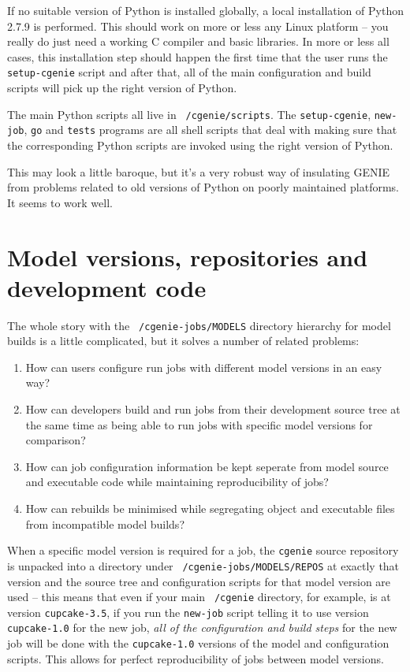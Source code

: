 \documentclass[a4paper,10pt,article]{memoir}
\begin{document}
If no suitable version of Python is installed globally, a local
installation of Python 2.7.9 is performed.  This should work on more
or less any Linux platform -- you really do just need a working C
compiler and basic libraries.  In more or less all cases, this
installation step should happen the first time that the user runs the
\texttt{setup-cgenie} script and after that, all of the main
configuration and build scripts will pick up the right version of
Python.

The main Python scripts all live in \texttt{~/cgenie/scripts}.  The
\texttt{setup-cgenie}, \texttt{new-job}, \texttt{go} and
\texttt{tests} programs are all shell scripts that deal with making
sure that the corresponding Python scripts are invoked using the right
version of Python.

This may look a little baroque, but it's a very robust way of
insulating GENIE from problems related to old versions of Python on
poorly maintained platforms.  It seems to work well.

\section{Model versions, repositories and development code}

The whole story with the \texttt{~/cgenie-jobs/MODELS} directory
hierarchy for model builds is a little complicated, but it solves a
number of related problems:
\begin{enumerate}
  \item{How can users configure run jobs with different model versions
    in an easy way?}
  \item{How can developers build and run jobs from their development
    source tree at the same time as being able to run jobs with
    specific model versions for comparison?}
  \item{How can job configuration information be kept seperate from
    model source and executable code while maintaining reproducibility
    of jobs?}
  \item{How can rebuilds be minimised while segregating object and
    executable files from incompatible model builds?}
\end{enumerate}

When a specific model version is required for a job, the
\texttt{cgenie} source repository is unpacked into a directory under
\texttt{~/cgenie-jobs/MODELS/REPOS} at exactly that version and the
source tree and configuration scripts for that model version are used
-- this means that even if your main \texttt{~/cgenie} directory, for
example, is at version \texttt{cupcake-3.5}, if you run the
\texttt{new-job} script telling it to use version \texttt{cupcake-1.0}
for the new job, \emph{all of the configuration and build steps} for
the new job will be done with the \texttt{cupcake-1.0} versions of the
model and configuration scripts.  This allows for perfect
reproducibility of jobs between model versions.
\end{document}
